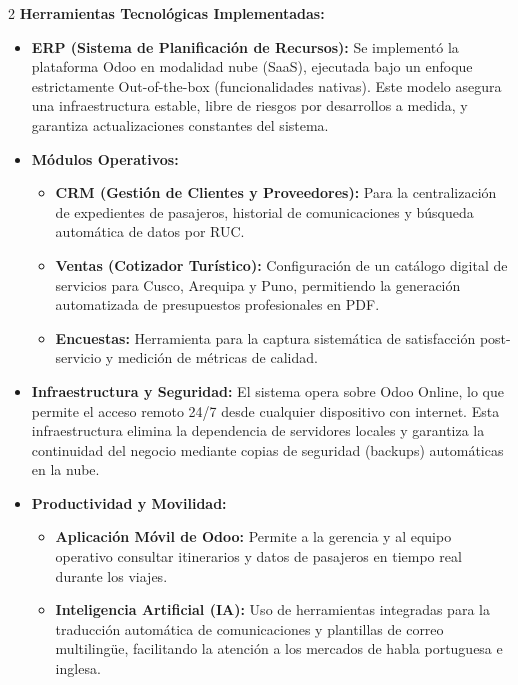 \documentclass[12pt]{article}
\begin{document}
\begin{multicols}{2}
\textbf{Herramientas Tecnológicas Implementadas:}
\begin{itemize}
    \item \textbf{ERP (Sistema de Planificación de Recursos):} Se implementó la plataforma Odoo en modalidad nube (SaaS), ejecutada bajo un enfoque estrictamente Out-of-the-box (funcionalidades nativas). Este modelo asegura una infraestructura estable, libre de riesgos por desarrollos a medida, y garantiza actualizaciones constantes del sistema.
    \item \textbf{Módulos Operativos:}
    \begin{itemize}
        \item \textbf{CRM (Gestión de Clientes y Proveedores):} Para la centralización de expedientes de pasajeros, historial de comunicaciones y búsqueda automática de datos por RUC.
        \item \textbf{Ventas (Cotizador Turístico):} Configuración de un catálogo digital de servicios para Cusco, Arequipa y Puno, permitiendo la generación automatizada de presupuestos profesionales en PDF.
        \item \textbf{Encuestas:} Herramienta para la captura sistemática de satisfacción post-servicio y medición de métricas de calidad.
    \end{itemize}
    \item \textbf{Infraestructura y Seguridad:} El sistema opera sobre Odoo Online, lo que permite el acceso remoto 24/7 desde cualquier dispositivo con internet. Esta infraestructura elimina la dependencia de servidores locales y garantiza la continuidad del negocio mediante copias de seguridad (backups) automáticas en la nube.
    \item \textbf{Productividad y Movilidad:}
    \begin{itemize}
        \item \textbf{Aplicación Móvil de Odoo:} Permite a la gerencia y al equipo operativo consultar itinerarios y datos de pasajeros en tiempo real durante los viajes.
        \item \textbf{Inteligencia Artificial (IA):} Uso de herramientas integradas para la traducción automática de comunicaciones y plantillas de correo multilingüe, facilitando la atención a los mercados de habla portuguesa e inglesa.
    \end{itemize}
\end{itemize}


\end{multicols}
\end{document}
